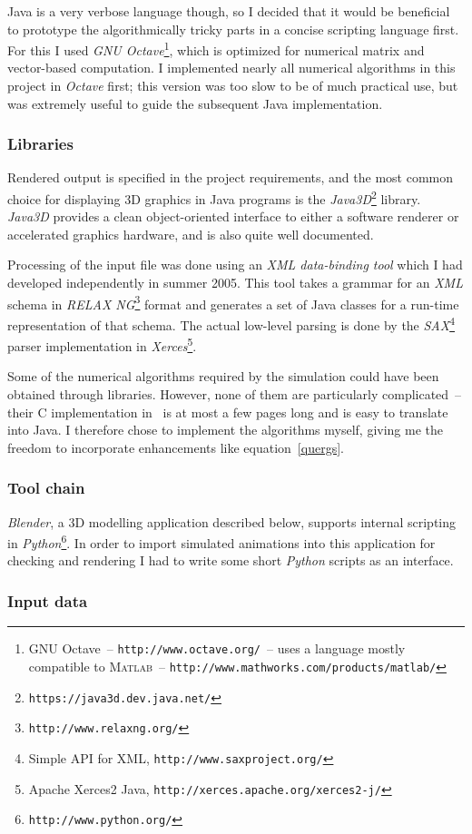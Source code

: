 Java is a very verbose language though, so I decided that it would be beneficial to prototype
the algorithmically tricky parts in a concise scripting language first. For this I used
\textsl{GNU Octave}\footnote{GNU Octave~-- \texttt{http://www.octave.org/}~-- uses a language
mostly compatible to \textsc{Matlab}~-- \texttt{http://www.mathworks.com/products/matlab/}},
which is optimized for numerical matrix and vector-based computation. I implemented nearly all
numerical algorithms in this project in \textsl{Octave} first; this version was too slow to be
of much practical use, but was extremely useful to guide the subsequent Java implementation.

\subsubsection{Libraries}
Rendered output is specified in the project requirements, and the most common choice for
displaying 3D graphics in Java programs is the
\textsl{Java3D}\footnote{\texttt{https://java3d.dev.java.net/}} library. \textsl{Java3D} provides
a clean object-oriented interface to either a software renderer or accelerated graphics hardware,
and is also quite well documented.

Processing of the input file was done using an \textsl{XML data-binding tool} which I had
developed independently in summer 2005. This tool takes a grammar for an \textsl{XML} schema in
\textsl{RELAX NG}\footnote{\texttt{http://www.relaxng.org/}} format and generates a set of
Java classes for a run-time representation of that schema. The actual low-level parsing is done
by the \textsl{SAX}\footnote{Simple API for XML, \texttt{http://www.saxproject.org/}} parser
implementation in \textsl{Xerces}\footnote{Apache Xerces2 Java,
\texttt{http://xerces.apache.org/xerces2-j/}}.

Some of the numerical algorithms required by the simulation could have been obtained through
libraries. However, none of them are particularly complicated~-- their C implementation
in~\cite{NRinC} is at most a few pages long and is easy to translate into Java. I therefore chose
to implement the algorithms myself, giving me the freedom to incorporate enhancements like
equation~\ref{quergs}.

\subsubsection{Tool chain}

\textsl{Blender}, a 3D modelling application described below, supports internal scripting in
\textsl{Python}\footnote{\texttt{http://www.python.org/}}. In order to import simulated animations
into this application for checking and rendering I had to write some short \textsl{Python} scripts
as an interface.

\subsubsection{Input data}

